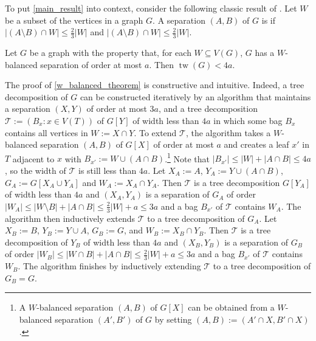 \documentclass{patmorin}
\DeclareMathOperator{\tw}{tw}
\begin{document}
To put \cref{main_result} into context, consider the following classic result of \citet{robertson.seymour:graph}.
Let $W$ be a subset of the vertices in a graph $G$.  A separation $(A,B)$ of $G$ is  if $|(A\setminus B)\cap W|\le \tfrac{2}{3}|W|$ and $|(A\setminus B)\cap W|\le \tfrac{2}{3}|W|$.

\begin{thm}\label{w_balanced_theorem}
    Let $G$ be a graph with the property that, for each $W\subseteq V(G)$, $G$ has a $W$-balanced separation of order at most $a$. Then  $\tw(G)<4a$.
\end{thm}

The proof of \cref{w_balanced_theorem} is constructive and intuitive.  Indeed, a tree decomposition of $G$ can be constructed iteratively by an algorithm that maintains a separation $(X,Y)$ of order at most $3a$, and a tree decomposition $\mathcal{T}:=(B_x:x\in V(T))$ of $G[Y]$ of width less than $4a$ in which some bag $B_x$ contains all vertices in $W:=X\cap Y$.  To extend $\mathcal{T}$, the algorithm takes a $W$-balanced separation $(A,B)$ of $G[X]$ of order at most $a$ and creates a leaf $x'$ in $T$ adjacent to $x$ with $B_{x'}:=W\cup (A\cap B)$.\footnote{A $W$-balanced separation $(A,B)$ of $G[X]$ can be obtained from a $W$-balanced separation $(A',B')$ of $G$ by setting $(A,B):=(A'\cap X,B'\cap X)$.}  Note that $|B_{x'}|\le |W|+|A\cap B|\le 4a$, so the width of $\mathcal{T}$ is still less than $4a$.
Let $X_A:=A$, $Y_A:=Y\cup(A\cap B)$, $G_A:=G[X_A\cup Y_A]$ and $W_A:=X_A\cap Y_A$.  Then $\mathcal{T}$ is a tree decomposition $G[Y_A]$ of width less than $4a$ and $(X_A,Y_A)$ is a separation of $G_A$ of order $|W_A|\le|W\setminus B|+|A\cap B|\le \tfrac{2}{3}|W|+a\le 3a$ and a bag $B_{x'}$ of $\mathcal{T}$ contains $W_A$. The algorithm then inductively extends $\mathcal{T}$ to a tree decomposition of $G_A$.  Let $X_B:=B$, $Y_B:=Y\cup A$, $G_B:=G$, and $W_B:=X_B\cap Y_B$.  Then $\mathcal{T}$ is a tree decomposition of $Y_B$ of width less than $4a$ and $(X_B,Y_B)$ is a separation of $G_B$ of order $|W_B|\le |W\cap B|+|A\cap B|\le\tfrac{2}{3}|W|+a\le 3a$ and a bag $B_{x'}$ of $\mathcal{T}$ contains $W_B$.  The algorithm finishes by inductively extending $\mathcal{T}$ to a tree decomposition of $G_B=G$.

\end{document}

